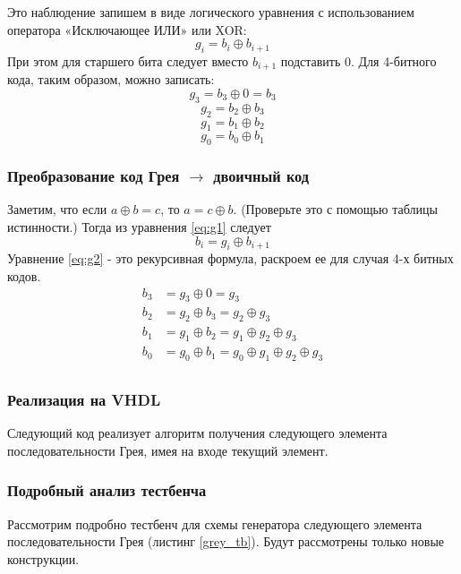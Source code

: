 Это наблюдение запишем в виде логического уравнения с использованием оператора «Исключающее ИЛИ» или XOR: 
\begin{equation}
g_{i}=b_{i} \oplus b_{i+1}
\label{eq:g1}
\end{equation}
При этом для старшего бита следует вместо $b_{i+1}$ подставить $0$. Для 4-битного кода, таким образом, можно записать:
\[g_{3}=b_{3} \oplus 0=b_{3}\]
\[g_{2}=b_{2} \oplus b_{3}\]
\[g_{1}=b_{1} \oplus b_{2}\]
\[g_{0}=b_{0} \oplus b_{1}\]

\subsubsection{Преобразование код Грея $\to$ двоичный код}

Заметим, что если $a \oplus b = c$, то $a = c \oplus b$. (Проверьте это с помощью таблицы истинности.) Тогда из уравнения \ref{eq:g1} следует
\begin{equation}
b_{i}=g_{i} \oplus b_{i+1}
\label{eq:g2}
\end{equation}
Уравнение \ref{eq:g2} - это рекурсивная формула, раскроем ее для случая 4-х битных кодов. 
\[ \begin{aligned}
b_3 &= g_3 \oplus 0 = g_3                                       \\
b_2 &= g_2 \oplus b_3 = g_2 \oplus g_3                          \\
b_1 &= g_1 \oplus b_2 = g_1 \oplus g_2 \oplus g_3               \\
b_0 &= g_0 \oplus b_1 = g_0 \oplus g_1 \oplus g_2 \oplus g_3    \\
\end{aligned} \]

\subsubsection{Реализация на VHDL}

Следующий код реализует алгоритм получения следующего элемента последовательности Грея, имея на входе текущий элемент. 

 

\subsubsection{Подробный анализ тестбенча}

Рассмотрим подробно тестбенч для схемы генератора следующего элемента последовательности Грея (листинг \ref{grey_tb}). Будут рассмотрены только новые конструкции. 

